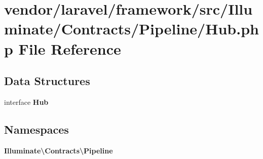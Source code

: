 \section{vendor/laravel/framework/src/\+Illuminate/\+Contracts/\+Pipeline/\+Hub.php File Reference}
\label{_contracts_2_pipeline_2_hub_8php}
\subsection*{Data Structures}
\begin{DoxyCompactItemize}
\item 
interface {\bf Hub}
\end{DoxyCompactItemize}
\subsection*{Namespaces}
\begin{DoxyCompactItemize}
\item 
 {\bf Illuminate\textbackslash{}\+Contracts\textbackslash{}\+Pipeline}
\end{DoxyCompactItemize}
